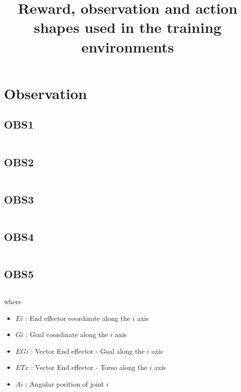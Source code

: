 \documentclass{article}
\title{Reward, observation and action shapes used in the training environments}
\date{}
\begin{document}
\maketitle


\section{Observation}

\subsection*{OBS1} 
\begin{equation}
[Ex, Ey, Ez, A1, A2, A3, A4, A5, A6]
\end{equation}

\subsection*{OBS2}
\begin{equation}
[Gx, Gy, Gz, A1, A2, A3, A4, A5, A6]
\end{equation}

\subsection*{OBS3}
\begin{equation}
[ETx, ETy, ETz, EGx, EGy, EGz, A1, A2, A3, A4, A5, A6]
\end{equation}

\subsection*{OBS4}
\begin{equation}
[EGx, EGy, EGz, A1, A2, A3, A4, A5, A6]
\end{equation}

\subsection*{OBS5}
\begin{equation}
[ETx, ETy, ETz, EGx, EGy, EGz, Gx, Gy, Gz, A1, A2, A3, A4, A5, A6]
\end{equation}

where
\begin{itemize}  
\item $Ei$ : End effector coordinate along the $i$ axis
\item $Gi$ : Goal coordinate along the $i$ axis 
\item $EGi$ : Vector End effector - Goal along the $i$ axis 
\item $ETx$ : Vector End effector - Torso along the $i$ axis
\item $Ai$ : Angular position of joint $i$
\end{itemize}
\end{document}
